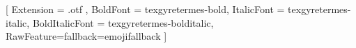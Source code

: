 \usepackage[version=4]{mhchem}
\usepackage[english]{babel}
\usepackage{amsmath}
\usepackage{booktabs}
\usepackage{xcolor}
\usepackage{fontspec}
\usepackage{emoji}
\usepackage{float}
\usepackage{caption}
\usepackage{fontawesome5}
\captionsetup{labelfont = bf}
\usepackage{subcaption}
\captionsetup[sub]{labelfont = bf}
\usepackage[section]{placeins}
\usepackage{hyperref}
\renewcommand{\thefootnote}{\alph{footnote}}
\newcommand{\urlfoot}[2]{#2\footnote{\url{#1}}}
%
\usepackage{authblk}
\renewcommand*{\Authsep}{, }
\renewcommand*{\Authand}{, }
\renewcommand*{\Authands}{, }
\renewcommand\Affilfont{\small}
\setmainfont{texgyretermes-regular}[
  Extension      = .otf ,
  BoldFont       = texgyretermes-bold,
  ItalicFont     = texgyretermes-italic,
  BoldItalicFont = texgyretermes-bolditalic,
  RawFeature={fallback=emojifallback}
]
